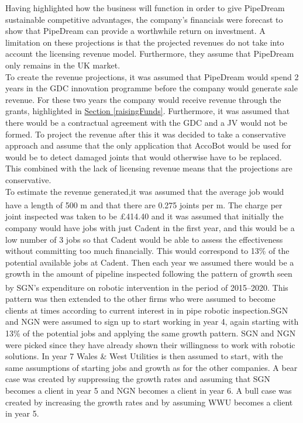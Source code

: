 \documentclass[11pt]{article}		%
\newcommand{\supercite}[1]{\textsuperscript{\cite{#1}}}		%
\newcommand{\sectref}[1]{\hyperref[#1]{Section \ref*{#1}}}     %
\begin{document}
	 Having highlighted how the business will function in order to give PipeDream sustainable competitive advantages, the company’s financials were forecast to show that PipeDream can provide a worthwhile return on investment.
    A limitation on these projections is that the projected revenues do not take into account the licensing revenue model. Furthermore, they assume that PipeDream only remains in the UK market.
    \\ 
    \hspace*{3ex}To create the revenue projections, it was assumed that PipeDream would spend 2 years in the GDC innovation programme before the company would generate sale revenue. For these two years the company would receive revenue through the grants, highlighted in \sectref{raisingFunds}. Furthermore, it was assumed that there would be a contractual agreement with the GDC and a JV would not be formed. To project the revenue after this it was decided to take a conservative approach and assume that the only application that AccoBot would be used for would be to detect damaged joints that would otherwise have to be replaced. This combined with the lack of licensing revenue means that the projections are conservative. 
    \\ 
    \hspace*{3ex}To estimate the revenue generated,it was  assumed that the average job would have a length of 500 m and that there are 0.275 joints per m.\supercite{SGN_Southern}
    The charge per joint inspected was taken to be £414.40 and it was assumed that initially the company would have jobs with just Cadent in the first year, and this would be a low number of 3 jobs so that  Cadent would be able to assess the effectiveness without committing too much financially. This would correspond to 13\% of the potential available jobs at Cadent. Then each year we assumed there would be a growth in the amount of pipeline inspected following the pattern of growth seen by SGN’s expenditure on robotic intervention in the period of 2015--2020.\supercite{SGN_Southern} This pattern was then extended to the other firms who were assumed to become clients at times according to current interest in in pipe robotic inspection.SGN and NGN were assumed to sign up to start working in year 4, again starting with 13\% of the potential jobs and applying the same growth pattern. SGN and NGN were picked since they have already shown their willingness to work with robotic solutions. In year 7 Wales \& West Utilities is then assumed to start, with the same assumptions of starting jobs and growth as for the other companies. A bear case was created by suppressing the growth rates and assuming that SGN becomes a client in year 5 and NGN becomes a client in year 6. A bull case was created by increasing the growth rates and by assuming WWU becomes a client in year 5.
\end{document}

